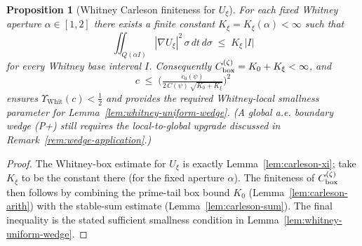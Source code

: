 \documentclass[11pt]{article}
\newtheorem{proposition}[theorem]{Proposition}
\theoremstyle{definition}
\theoremstyle{remark}
\theoremstyle{definition}
\begin{document}
\begin{proposition}[Whitney Carleson finiteness for $U_\xi$]\label{prop:Kxi-finite}
For each fixed Whitney aperture $\alpha\in[1,2]$ there exists a finite constant
$K_\xi=K_\xi(\alpha)<\infty$ such that
\[
  \iint_{Q(\alpha I)} |\nabla U_\xi|^2\,\sigma\,dt\,d\sigma \;\le\; K_\xi\,|I|
\]
for every Whitney base interval $I$. Consequently $C_{\rm box}^{(\zeta)}=K_0+K_\xi<\infty$, and
\[
  c \;\le\; \Big(\tfrac{c_0(\psi)}{2\,C(\psi)\,\sqrt{K_0+K_\xi}}\Big)^2
\]
ensures $\Upsilon_{\mathrm{Whit}}(c)<\tfrac12$ and provides the required Whitney-local smallness parameter for Lemma~\ref{lem:whitney-uniform-wedge}. (A global a.e. boundary wedge \textup{(P+)} still requires the local-to-global upgrade discussed in Remark~\ref{rem:wedge-application}.)
\end{proposition}
\begin{proof}
The Whitney-box estimate for $U_\xi$ is exactly Lemma~\ref{lem:carleson-xi}; take $K_\xi$ to be the constant there (for the fixed aperture $\alpha$). The finiteness of $C_{\rm box}^{(\zeta)}$ then follows by combining the prime-tail box bound $K_0$ (Lemma~\ref{lem:carleson-arith}) with the stable-sum estimate (Lemma~\ref{lem:carleson-sum}). The final inequality is the stated sufficient smallness condition in Lemma~\ref{lem:whitney-uniform-wedge}.
\end{proof}
\end{document}
